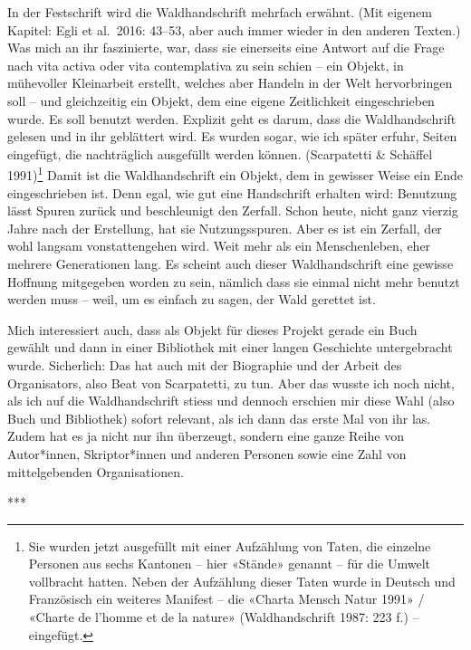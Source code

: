 \documentclass[a4paper,
fontsize=11pt,
oneside,
numbers=noperiodatend,
parskip=half-,
bibliography=totoc,
final
]{scrartcl}
\begin{document}
In der Festschrift wird die Waldhandschrift mehrfach erwähnt. (Mit
eigenem Kapitel: Egli et al.~2016: 43--53, aber auch immer wieder in den
anderen Texten.) Was mich an ihr faszinierte, war, dass sie einerseits
eine Antwort auf die Frage nach vita activa oder vita contemplativa zu
sein schien -- ein Objekt, in mühevoller Kleinarbeit erstellt, welches
aber Handeln in der Welt hervorbringen soll -- und gleichzeitig ein
Objekt, dem eine eigene Zeitlichkeit eingeschrieben wurde. Es soll
benutzt werden. Explizit geht es darum, dass die Waldhandschrift gelesen
und in ihr geblättert wird. Es wurden sogar, wie ich später erfuhr,
Seiten eingefügt, die nachträglich ausgefüllt werden können.
(Scarpatetti \& Schäffel 1991)\footnote{Sie wurden jetzt ausgefüllt mit
  einer Aufzählung von Taten, die einzelne Personen aus sechs Kantonen
  -- hier «Stände» genannt -- für die Umwelt vollbracht hatten. Neben
  der Aufzählung dieser Taten wurde in Deutsch und Französisch ein
  weiteres Manifest -- die «Charta Mensch Natur 1991» / «Charte de
  l'homme et de la nature» (Waldhandschrift 1987: 223 f.) -- eingefügt.}
Damit ist die Waldhandschrift ein Objekt, dem in gewisser Weise ein Ende
eingeschrieben ist. Denn egal, wie gut eine Handschrift erhalten wird:
Benutzung lässt Spuren zurück und beschleunigt den Zerfall. Schon heute,
nicht ganz vierzig Jahre nach der Erstellung, hat sie Nutzungsspuren.
Aber es ist ein Zerfall, der wohl langsam vonstattengehen wird. Weit
mehr als ein Menschenleben, eher mehrere Generationen lang. Es scheint
auch dieser Waldhandschrift eine gewisse Hoffnung mitgegeben worden zu
sein, nämlich dass sie einmal nicht mehr benutzt werden muss -- weil, um
es einfach zu sagen, der Wald gerettet ist.

Mich interessiert auch, dass als Objekt für dieses Projekt gerade ein
Buch gewählt und dann in einer Bibliothek mit einer langen Geschichte
untergebracht wurde. Sicherlich: Das hat auch mit der Biographie und der
Arbeit des Organisators, also Beat von Scarpatetti, zu tun. Aber das
wusste ich noch nicht, als ich auf die Waldhandschrift stiess und
dennoch erschien mir diese Wahl (also Buch und Bibliothek) sofort
relevant, als ich dann das erste Mal von ihr las. Zudem hat es ja nicht
nur ihn überzeugt, sondern eine ganze Reihe von Autor*innen,
Skriptor*innen und anderen Personen sowie eine Zahl von mittelgebenden
Organisationen.

\begin{center}
***
\end{center}
\end{document}
